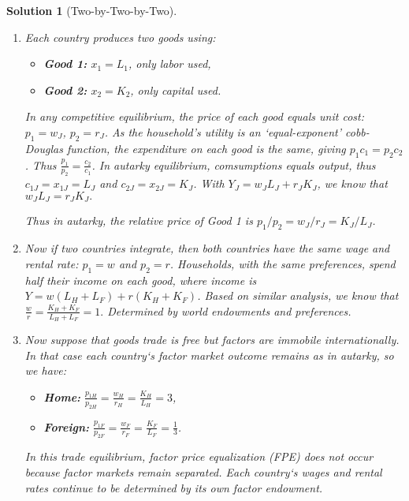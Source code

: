 \documentclass[a4paper,12pt]{article} %
\theoremstyle{nonitalic}
\newtheorem{solution}{Solution}
\begin{document}
\begin{solution}[Two-by-Two-by-Two]
    \

    \begin{enumerate}
        \item[1.] Each country produces two goods using:
            \begin{itemize}
                \item \textbf{Good 1:} $x_1 = L_1$, only labor used,
                \item \textbf{Good 2:} $x_2 = K_2$, only capital used.
            \end{itemize}
            In any competitive equilibrium, the price of each good equals unit cost: $p_1 = w_J$, $p_2 = r_J$.
            As the household's utility is an `equal-exponent' cobb-Douglas function, the expenditure on each good is the same, giving $p_1 c_1 = p_2 c_2$.
            Thus $\frac{p_1}{p_2} = \frac{c_2}{c_1}$. In autarky equilibrium, comsumptions equals output, thus
            $c_{1J} = x_{1J} =L_J$ and $c_{2J} = x_{2J} = K_J$. With $Y_J = w_J L_J + r_J K_J$, we know that $w_J L_J = r_J K_J.$

            Thus in autarky, the relative price of Good 1 is $p_1/p_2 = w_J/r_J = K_J/L_J$.

        \item[2.] Now if two countries integrate, then both countries have the same wage and rental rate: $p_1 = w$ and $p_2 = r$.
        Households, with the same preferences, spend half their income on each good, where income is $Y = w(L_H + L_F) + r(K_H + K_F)$.
        Based on similar analysis, we know that $\frac{w}{r} = \frac{K_H + K_F}{L_H + L_F} = 1.$ Determined by world endowments and preferences.

        \item[3.] Now suppose that goods trade is free but factors are immobile internationally. 
        In that case each country`s factor market outcome remains as in autarky, so we have:
        \begin{itemize}
            \item \textbf{Home:} $\frac{p_{1H}}{p_{2H}} = \frac{w_H}{r_H} = \frac{K_H}{L_H} = 3$,
            \item \textbf{Foreign:} $\frac{p_{1F}}{p_{2F}} = \frac{w_F}{r_F} = \frac{K_F}{L_F} = \frac{1}{3}$.
        \end{itemize}
        In this trade equilibrium, factor price equalization (FPE) does not occur because factor markets remain separated.
        Each country`s wages and rental rates continue to be determined by its own factor endowment.


\end{enumerate}
\end{solution}
\end{document}
